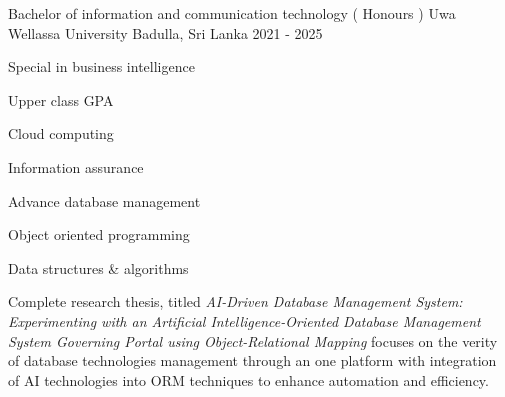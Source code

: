 

\begin{cventries}

  \cventry
    {Bachelor of information and communication technology ( Honours )} %
    {Uwa Wellassa University} %
    {Badulla, Sri Lanka} %
    {2021 - 2025} %
    {
      \begin{cvitems} %
        \item {Special in business intelligence }
        \item {Upper class GPA}
        \item {Cloud computing}
        \item {Information assurance }
        \item {Advance database management}
        \item {Object oriented programming}
        \item {Data structures  &  algorithms}
        \item {Complete research thesis, titled \textit{AI-Driven Database Management System: Experimenting with an Artificial Intelligence-Oriented Database Management System Governing Portal using Object-Relational Mapping} focuses on the verity of database technologies management through an one platform with integration of AI technologies into ORM techniques to enhance automation and efficiency.}
      \end{cvitems}
    }

\end{cventries}
